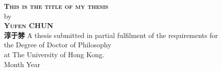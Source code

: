 

%
%
\begin{titlepage}
	\begin{center}
		\large  
	        \hfill
	        \vfill
        \begingroup
            \huge\textsc{\textbf{This is the title of my thesis}} \\
            \bigskip
        \endgroup
         by\\
	\bigskip  	
        \Large\textsc{\textbf{Yufen CHUN}}\\
						\textbf{淳于棼}
        \vfill
        \vfill
        \vfill
	{\normalsize
	A thesis submitted in partial fulfilment of the requirements for\\
	the Degree of Doctor of Philosophy\\
	at The University of Hong Kong.\\
		\bigskip
	Month Year}
        \vfill                      
    	\end{center}      
\end{titlepage}   